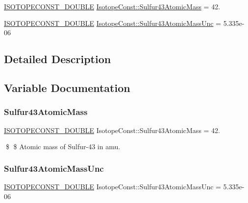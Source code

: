 \begin{DoxyCompactItemize}
\item 
\mbox{\hyperlink{group___isotope_const-_macros_ga8f45a7272ce02c0b4c65c44636ed719a}{I\+S\+O\+T\+O\+P\+E\+C\+O\+N\+S\+T\+\_\+\+D\+O\+U\+B\+LE}} \mbox{\hyperlink{group___isotope_const-_sulfur-_s43_ga44c16f05c629f0035fa3e8f69de3b40d}{Isotope\+Const\+::\+Sulfur43\+Atomic\+Mass}} = 42.
\item 
\mbox{\hyperlink{group___isotope_const-_macros_ga8f45a7272ce02c0b4c65c44636ed719a}{I\+S\+O\+T\+O\+P\+E\+C\+O\+N\+S\+T\+\_\+\+D\+O\+U\+B\+LE}} \mbox{\hyperlink{group___isotope_const-_sulfur-_s43_ga75c454529b8fa1a7340d3dda26e8a87b}{Isotope\+Const\+::\+Sulfur43\+Atomic\+Mass\+Unc}} = 5.\+335e-\/06
\end{DoxyCompactItemize}


\subsection{Detailed Description}


\subsection{Variable Documentation}
\mbox{\label{group___isotope_const-_sulfur-_s43_ga44c16f05c629f0035fa3e8f69de3b40d}} 
\subsubsection{\texorpdfstring{Sulfur43\+Atomic\+Mass}{Sulfur43AtomicMass}}
{\footnotesize\ttfamily \mbox{\hyperlink{group___isotope_const-_macros_ga8f45a7272ce02c0b4c65c44636ed719a}{I\+S\+O\+T\+O\+P\+E\+C\+O\+N\+S\+T\+\_\+\+D\+O\+U\+B\+LE}} Isotope\+Const\+::\+Sulfur43\+Atomic\+Mass = 42.}

\$ \$ Atomic mass of Sulfur-\/43 in amu. \mbox{\label{group___isotope_const-_sulfur-_s43_ga75c454529b8fa1a7340d3dda26e8a87b}} 
\subsubsection{\texorpdfstring{Sulfur43\+Atomic\+Mass\+Unc}{Sulfur43AtomicMassUnc}}
{\footnotesize\ttfamily \mbox{\hyperlink{group___isotope_const-_macros_ga8f45a7272ce02c0b4c65c44636ed719a}{I\+S\+O\+T\+O\+P\+E\+C\+O\+N\+S\+T\+\_\+\+D\+O\+U\+B\+LE}} Isotope\+Const\+::\+Sulfur43\+Atomic\+Mass\+Unc = 5.\+335e-\/06}

